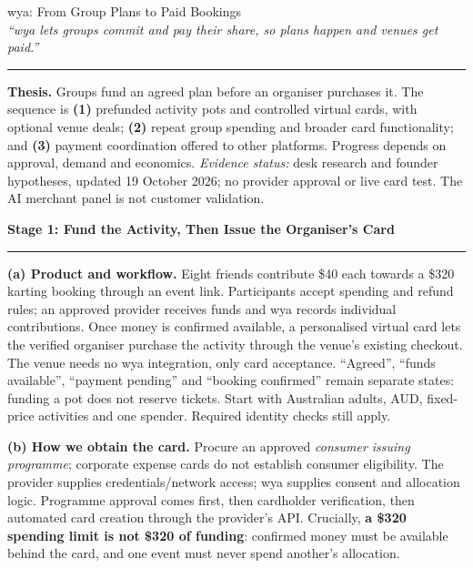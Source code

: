 \documentclass[10pt, a4paper]{report}
\newcommand{\qtitle}[1]{%
    \vspace{0.4em}%
    \noindent\textbf{\large #1}\par%
    \vspace{-1.5em}%
    \noindent\rule{\linewidth}{0.8pt}%
    \vspace{0.1em}%
}
\begin{document}

\begin{center}
{\large wya: From Group Plans to Paid Bookings \\[0.4em]}
{\normalsize\itshape ``wya lets groups commit and pay their share, so plans happen and venues get paid.''}
\end{center}
\vspace{-1.0em}
\noindent\rule{\linewidth}{0.8pt}

\textbf{Thesis.} Groups fund an agreed plan before an organiser purchases it. The sequence is \textbf{(1)} prefunded activity pots and controlled virtual cards, with optional venue deals; \textbf{(2)} repeat group spending and broader card functionality; and \textbf{(3)} payment coordination offered to other platforms. Progress depends on approval, demand and economics. \emph{Evidence status:} desk research and founder hypotheses, updated 19 October 2026; no provider approval or live card test. The AI merchant panel is not customer validation.

\qtitle{Stage 1: Fund the Activity, Then Issue the Organiser's Card}

\textbf{(a) Product and workflow.} Eight friends contribute \$40 each towards a \$320 karting booking through an event link. Participants accept spending and refund rules; an approved provider receives funds and wya records individual contributions. Once money is confirmed available, a personalised virtual card lets the verified organiser purchase the activity through the venue's existing checkout. The venue needs no wya integration, only card acceptance. ``Agreed'', ``funds available'', ``payment pending'' and ``booking confirmed'' remain separate states: funding a pot does not reserve tickets. Start with Australian adults, AUD, fixed-price activities and one spender. Required identity checks still apply.

\textbf{(b) How we obtain the card.} Procure an approved \emph{consumer issuing programme}; corporate expense cards do not establish consumer eligibility. The provider supplies credentials/network access; wya supplies consent and allocation logic. Programme approval comes first, then cardholder verification, then automated card creation through the provider's API.  Crucially, \textbf{a \$320 spending limit is not \$320 of funding}: confirmed money must be available behind the card, and one event must never spend another's allocation.
\end{document}
